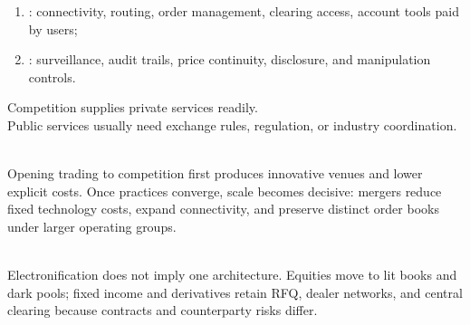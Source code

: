 \begin{taxonomy} 
\begin{enumerate}[label=\roman*.]
\setlength{\itemsep}{0pt}
\item {}: connectivity, routing, order management, clearing access, account tools paid by users;
\item {}: surveillance, audit trails, price continuity, disclosure, and manipulation controls.
\end{enumerate}
Competition supplies private services readily.\\
Public services usually need exchange rules, regulation, or industry coordination.
\end{taxonomy}

\begin{mechanism} \\
Opening trading to competition first produces innovative venues and lower explicit costs. Once practices converge, scale becomes decisive: mergers reduce fixed technology costs, expand connectivity, and preserve distinct order books under larger operating groups.
\end{mechanism}

\begin{practitionernote} \\
Electronification does not imply one architecture. Equities move to lit books and dark pools; fixed income and derivatives retain RFQ, dealer networks, and central clearing because contracts and counterparty risks differ.
\end{practitionernote}
